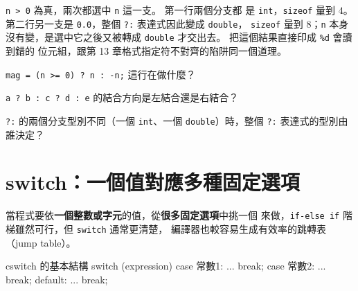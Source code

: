 \texttt{n > 0} 為真，兩次都選中 \texttt{n} 這一支。 第一行兩個分支都
是 \texttt{int}，\texttt{sizeof} 量到 $4$。 第二行另一支是
\texttt{0.0}，整個 \texttt{?:} 表達式因此變成 \texttt{double}，
\texttt{sizeof} 量到 $8$；\texttt{n} 本身沒有變，是選中它之後又被轉成
\texttt{double} 才交出去。 把這個結果直接印成 \texttt{\%d} 會讀到錯的
位元組，跟第 13 章格式指定符不對齊的陷阱同一個道理。



\begin{drills}[label=drills:cond-ternary]
\item \texttt{mag = (n >= 0) ? n : -n;} 這行在做什麼？
\item \texttt{a ? b : c ? d : e} 的結合方向是左結合還是右結合？
\item \texttt{?:} 的兩個分支型別不同（一個 \texttt{int}、一個
\texttt{double}）時，整個 \texttt{?:} 表達式的型別由誰決定？
\end{drills}

\section{switch：一個值對應多種固定選項}
\label{sec:cond-switch}

當程式要依\textbf{一個整數或字元}的值，從\textbf{很多固定選項}中挑一個
來做，\texttt{if-else if} 階梯雖然可行，但 \texttt{switch} 通常更清楚，
編譯器也較容易生成有效率的跳轉表（jump table）。

\begin{code}{c}{switch 的基本結構}
switch (expression) {
    case 常數1:
        ...
        break;
    case 常數2:
        ...
        break;
    default:
        ...
        break;
}
\end{code}

